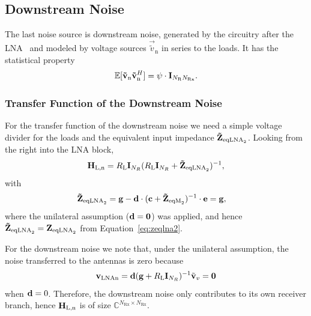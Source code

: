 \subsection{Downstream Noise}
\label{sec:down_noise}
The last noise source is downstream noise, generated by the circuitry after the LNA~\cite{Hughes2012} and modeled by voltage sources $\vec{\tilde{v}}_\text{n}$ in series to the loads.
It has the statistical property
\begin{equation}
\label{eq:cov_down}
\mathbb{E}[\mathbf{\tilde{v}}_\text{n}\mathbf{\tilde{v}}_\text{n}^H] = \psi\cdot\mathbf{I}_{N_\text{R}N_\text{Rx}}.
\end{equation}

\subsubsection{Transfer Function of the Downstream Noise}
\label{sec:down_noise_transf}
For the transfer function of the downstream noise we need a simple voltage divider for the loads and the equivalent input impedance $\mathbf{\tilde{Z}}_{\text{eqLNA}_2}$.
Looking from the right into the LNA block,
\begin{equation}
\label{eq:down_tf}
\mathbf{H}_\text{L,n} = R_\text{L}\mathbf{I}_{N_R}(R_\text{L}\mathbf{I}_{N_R} + \mathbf{\tilde{Z}}_{\text{eqLNA}_2})^{-1},
\end{equation}
with 
\begin{align}
\label{eq:zeqlna2_down}
\mathbf{\tilde{Z}}_{\text{eqLNA}_2} &= \mathbf{g} - \mathbf{d}\cdot(\mathbf{c} + \mathbf{\tilde{Z}}_{\text{eqM}_2})^{-1}\cdot\mathbf{e} = \mathbf{g},
\end{align}
where the unilateral assumption ($\mathbf{d}=\mathbf{0}$) was applied, and hence $\mathbf{\tilde{Z}}_{\text{eqLNA}_2}=\mathbf{Z}_{\text{eqLNA}_2}$ from Equation~\eqref{eq:zeqlna2}.

For the downstream noise we note that, under the unilateral assumption, the noise transferred to the antennas is zero because
\begin{align}
\mathbf{v}_\text{LNAn} = \mathbf{d}(\mathbf{g}+R_\text{L}\mathbf{I}_{N_R})^{-1} \tilde{\mathbf{v}}_{v}=\mathbf{0}
\end{align}
when $\mathbf{d}=0$.
Therefore, the downstream noise only contributes to its own receiver branch, hence $\mathbf{H}_\text{L,n}$ is of size $\mathbb{C}^{N_\text{Rx}\times N_\text{Rx}}$.

